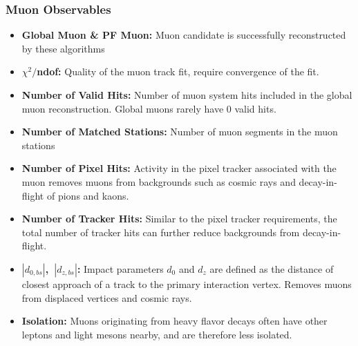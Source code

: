 \subsubsection{Muon Observables}

\begin{itemize}
    \item \textbf{Global Muon \& PF Muon:} Muon candidate is successfully reconstructed by these algorithms
    \item \textbf{$\chi^2/$ndof:} Quality of the muon track fit, require convergence of the fit.
    \item \textbf{Number of Valid Hits:} Number of muon system hits included in the global muon reconstruction. Global muons rarely have 0 valid hits.
    \item \textbf{Number of Matched Stations:} Number of muon segments in the muon stations
    \item \textbf{Number of Pixel Hits:} Activity in the pixel tracker associated with the muon removes muons from backgrounds such as cosmic rays and decay-in-flight of pions and kaons. 
    \item \textbf{Number of Tracker Hits:} Similar to the pixel tracker requirements, the total number of tracker hits can further reduce backgrounds from decay-in-flight.
    \item \textbf{$|d_{0,bs}|$,~$|d_{z,bs}|$:} Impact parameters $d_0$ and $d_z$ are defined as the distance of closest approach of a track to the primary interaction vertex. Removes muons from displaced vertices and cosmic rays. 
    \item \textbf{Isolation:} Muons originating from heavy flavor decays often have other leptons and light mesons nearby, and are therefore less isolated.
\end{itemize}




